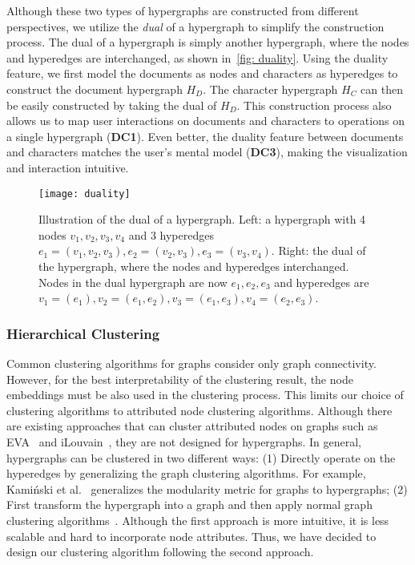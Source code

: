 Although these two types of hypergraphs are constructed from different perspectives, we utilize the \textit{dual} of a hypergraph to simplify the construction process.
The dual of a hypergraph is simply another hypergraph, where the nodes and hyperedges are interchanged, as shown in~\autoref{fig: duality}.
Using the duality feature, we first model the documents as nodes and characters as hyperedges to construct the document hypergraph $H_D$.
The character hypergraph $H_C$ can then be easily constructed by taking the dual of $H_D$.
This construction process also allows us to map user interactions on documents and characters to operations on a single hypergraph (\textbf{DC1}).
Even better, the duality feature between documents and characters matches the user's mental model (\textbf{DC3}), making the visualization and interaction intuitive.

\begin{figure}
 \centering %
 \texttt{[image: duality]}
 \captionsetup{belowskip=-14pt,aboveskip=3pt}
 \caption{Illustration of the dual of a hypergraph. 
 Left: a hypergraph with 4 nodes $v_1, v_2, v_3, v_4$ and 3 hyperedges $e_1=(v_1, v_2, v_3), e_2=(v_2, v_3), e_3=(v_3, v_4)$. 
 Right: the dual of the hypergraph, where the nodes and hyperedges interchanged.
 Nodes in the dual hypergraph are now $e_1, e_2, e_3$ and hyperedges are $v_1=(e_1), v_2=(e_1, e_2), v_3=(e_1, e_3), v_4=(e_2, e_3)$.
 }

\label{fig: duality}
\end{figure}

\subsubsection{Hierarchical Clustering}\label{sec: clustering}
Common clustering algorithms for graphs consider only graph connectivity.
However, for the best interpretability of the clustering result, the node embeddings must be also used in the clustering process.
This limits our choice of clustering algorithms to attributed node clustering algorithms.
Although there are existing approaches that can cluster attributed nodes on graphs such as EVA~\cite{citraro2020eva} and iLouvain~\cite{combe2015louvain}, they are not designed for hypergraphs.
In general, hypergraphs can be clustered in two different ways: 
(1) Directly operate on the hyperedges by generalizing the graph clustering algorithms.
For example, Kamiński et al.~\cite{kaminski2021hgraphcommunity} generalizes the modularity metric for graphs to hypergraphs; 
(2) First transform the hypergraph into a graph and then apply normal graph clustering algorithms~\cite{kumar2020new}.
Although the first approach is more intuitive, it is less scalable and hard to incorporate node attributes.
Thus, we have decided to design our clustering algorithm following the second approach.

